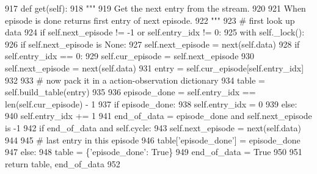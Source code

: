 \begin{DoxyCode}
917     \textcolor{keyword}{def }get(self):
918         \textcolor{stringliteral}{"""}
919 \textcolor{stringliteral}{        Get the next entry from the stream.}
920 \textcolor{stringliteral}{}
921 \textcolor{stringliteral}{        When episode is done returns first entry of next episode.}
922 \textcolor{stringliteral}{        """}
923         \textcolor{comment}{# first look up data}
924         \textcolor{keywordflow}{if} self.next\_episode != -1 \textcolor{keywordflow}{or} self.entry\_idx != 0:
925             with self.\_lock():
926                 \textcolor{keywordflow}{if} self.next\_episode \textcolor{keywordflow}{is} \textcolor{keywordtype}{None}:
927                     self.next\_episode = next(self.data)
928                 \textcolor{keywordflow}{if} self.entry\_idx == 0:
929                     self.cur\_episode = self.next\_episode
930                     self.next\_episode = next(self.data)
931                 entry = self.cur\_episode[self.entry\_idx]
932 
933                 \textcolor{comment}{# now pack it in a action-observation dictionary}
934                 table = self.build\_table(entry)
935 
936                 episode\_done = self.entry\_idx == len(self.cur\_episode) - 1
937                 \textcolor{keywordflow}{if} episode\_done:
938                     self.entry\_idx = 0
939                 \textcolor{keywordflow}{else}:
940                     self.entry\_idx += 1
941                 end\_of\_data = episode\_done \textcolor{keywordflow}{and} self.next\_episode \textcolor{keywordflow}{is} -1
942                 \textcolor{keywordflow}{if} end\_of\_data \textcolor{keywordflow}{and} self.cycle:
943                     self.next\_episode = next(self.data)
944 
945                 \textcolor{comment}{# last entry in this episode}
946                 table[\textcolor{stringliteral}{'episode\_done'}] = episode\_done
947         \textcolor{keywordflow}{else}:
948             table = \{\textcolor{stringliteral}{'episode\_done'}: \textcolor{keyword}{True}\}
949             end\_of\_data = \textcolor{keyword}{True}
950 
951         \textcolor{keywordflow}{return} table, end\_of\_data
952 
\end{DoxyCode}
\mbox{\label{classparlai_1_1core_1_1teachers_1_1StreamDialogData_a5f3e6484038cefcc177a635148f0b492}} 
